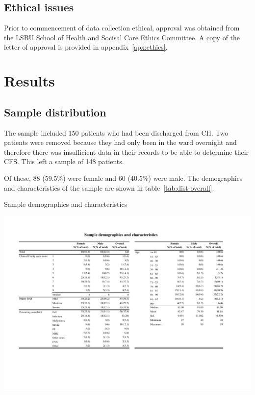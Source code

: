 \documentclass
[
	12pt,
	a4paper,
	oneside,
]{report}
\begin{document}
\section{Ethical issues}

Prior to commencement of data collection ethical, approval was obtained from
the LSBU School of Health and Socisal Care Ethics Committee. A copy of the
letter of approval is provided in appendix~\ref{apx:ethics}.
\chapter{Results}

\section{Sample distribution}

The sample included 150 patients who had been discharged from CH. Two patients
were removed because they had only been in the ward overnight and therefore
there was insufficient data in their records to be able to determine their
CFS. This left a sample of 148 patients. 

Of these, 88 (59.5\%) were female and 60 (40.5\%) were male. The demographics 
and characteristics of the sample are shown in table~\ref{tab:dist-overall}.

\begin{table}[p]
\centering
\caption{Sample demographics and characteristics}
\label{tab:dist-overall}
\includegraphics[width=\textwidth,
	trim={1.5cm 4cm 2.5cm 2cm},
	clip,
	angle=90,
	scale=1.45]{media/dist-overall}
\end{table}
\end{document}
